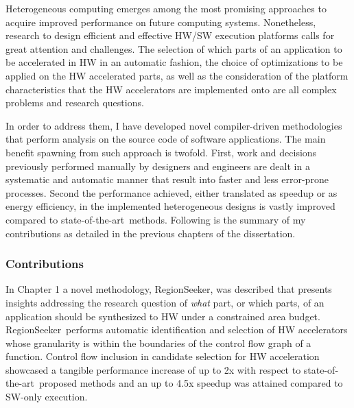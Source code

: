 \documentclass[]{usiinfthesis}
\newcommand{\rseeker}{{RegionSeeker}}
\newcommand{\SoTA}{{state-of-the-art}}
\begin{document}
Heterogeneous computing emerges among the most promising approaches to acquire improved performance on future 
computing systems. Nonetheless, research to design efficient and effective HW/SW execution platforms calls for great attention and challenges.
The selection of which parts of an application to be accelerated in HW in an automatic
fashion, the choice of optimizations to be applied on the HW accelerated parts, as well as the consideration of the 
platform characteristics that the HW accelerators are implemented onto are all complex problems and research questions.\par

In order to address them, I have developed novel compiler-driven methodologies that perform 
analysis on the source code of software applications. The main benefit spawning from such 
approach is twofold. First, work and decisions previously performed manually by designers and engineers are 
dealt in a systematic and automatic manner that result into faster and less error-prone processes.
Second the performance achieved, either translated as speedup or as energy 
efficiency, in the implemented heterogeneous designs is vastly improved compared to \SoTA\ methods.
Following is the summary of my contributions as detailed in the previous chapters of the dissertation.
\par

\subsubsection{Contributions}

In Chapter 1 a novel methodology, \rseeker, was described that presents insights addressing the 
research question of {\em what} part, or which parts, of an application should be synthesized to 
HW under a constrained area budget. \rseeker\ performs automatic identification and selection of 
HW accelerators whose granularity is within the boundaries of the control flow graph of a function.
Control flow inclusion in candidate selection for HW acceleration showcased a tangible performance 
increase of up to 2x with respect to \SoTA\ 
proposed methods and an up to 4.5x speedup was attained compared to SW-only execution.\par
\end{document}

